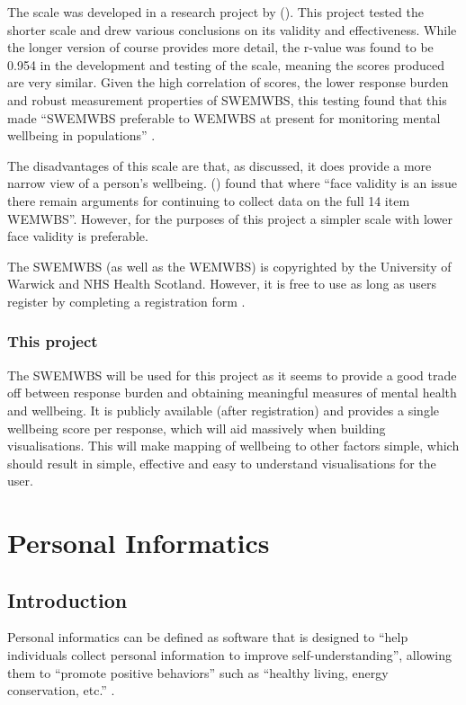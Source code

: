 \documentclass[11pt,openright,a4paper]{report}
\begin{document}
The scale was developed in a research project by \citeauthor{stewart2009internal} (\citeyear{stewart2009internal}). This project tested the shorter scale and drew various conclusions on its validity and effectiveness. While the longer version of course provides more detail, the r-value was found to be 0.954 in the development and testing of the scale, meaning the scores produced are very similar. Given the high correlation of scores, the lower response burden and robust measurement properties of SWEMWBS, this testing found that this made \enquote{SWEMWBS preferable to WEMWBS at present for monitoring mental wellbeing in populations} \parencite{stewart2009internal}.

The disadvantages of this scale are that, as discussed, it does provide a more narrow view of a person's wellbeing. \citeauthor{stewart2009internal} (\citeyear{stewart2009internal}) found that where \enquote{face validity is an issue there remain arguments for continuing to collect data on the full 14 item WEMWBS}. However, for the purposes of this project a simpler scale with lower face validity is preferable.

The SWEMWBS (as well as the WEMWBS) is copyrighted by the University of Warwick and NHS Health Scotland. However, it is free to use as long as users register by completing a registration form \parencite{wemwbsreg}.

\subsubsection{This project}
The SWEMWBS will be used for this project as it seems to provide a good trade off between response burden and obtaining meaningful measures of mental health and wellbeing. It is publicly available (after registration) and provides a single wellbeing score per response, which will aid massively when building visualisations. This will make mapping of wellbeing to other factors simple, which should result in simple, effective and easy to understand visualisations for the user.

\section{Personal Informatics} \label{personalinformatics}
\subsection{Introduction}
Personal informatics can be defined as software that is designed to \enquote{help individuals collect personal information to improve self-understanding}, allowing them to \enquote{promote positive behaviors} such as \enquote{healthy living, energy conservation, etc.} \parencite{li2012personal}.
\end{document}
